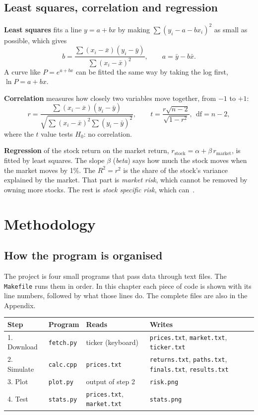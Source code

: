\documentclass[10pt,a4paper,openany,oneside]{book}
\newcommand{\file}[1]{\texttt{#1}}
\begin{document}
\section{Least squares, correlation and regression}
\textbf{Least squares} fits a line $y = a + bx$ by making $\sum (y_i - a - bx_i)^2$ as small as
possible, which gives
\begin{equation}
  b = \frac{\sum (x_i-\bar x)(y_i-\bar y)}{\sum (x_i-\bar x)^2}, \qquad a = \bar y - b\bar x .
\end{equation}
A curve like $P = e^{a+bx}$ can be fitted the same way by taking the log first,
$\ln P = a + bx$.

\textbf{Correlation} measures how closely two variables move together, from $-1$ to $+1$:
\begin{equation}
  r = \frac{\sum (x_i-\bar x)(y_i-\bar y)}{\sqrt{\sum (x_i-\bar x)^2 \sum (y_i-\bar y)^2}},
  \qquad t = \frac{r\sqrt{n-2}}{\sqrt{1-r^2}},\ \ \text{df}=n-2,
\end{equation}
where the $t$ value tests $H_0$: no correlation.

\textbf{Regression} of the stock return on the market return,
$r_{\text{stock}} = \alpha + \beta\, r_{\text{market}}$, is fitted by least squares. The slope
$\beta$ (\emph{beta}) says how much the stock moves when the market moves by 1\%. The
$R^2 = r^2$ is the share of the stock's variance explained by the market. That part is
\emph{market risk}, which cannot be removed by owning more stocks. The rest is
\emph{stock specific risk}, which can~\cite{hull}.

\chapter{Methodology}

\section{How the program is organised}
The project is four small programs that pass data through text files. The
\file{Makefile} runs them in order. In this chapter each piece of code is shown with its
line numbers, followed by what those lines do. The complete files are also in the Appendix.

\begin{center}
\begin{tabular}{@{}llll@{}}
\toprule
Step & Program & Reads & Writes \\
\midrule
1. Download & \file{fetch.py} & ticker (keyboard) & \file{prices.txt}, \file{market.txt}, \file{ticker.txt} \\
2. Simulate & \file{calc.cpp} & \file{prices.txt} & \file{returns.txt}, \file{paths.txt}, \file{finals.txt}, \file{results.txt} \\
3. Plot & \file{plot.py} & output of step 2 & \file{risk.png} \\
4. Test & \file{stats.py} & \file{prices.txt}, \file{market.txt} & \file{stats.png} \\
\bottomrule
\end{tabular}
\end{center}
\end{document}
